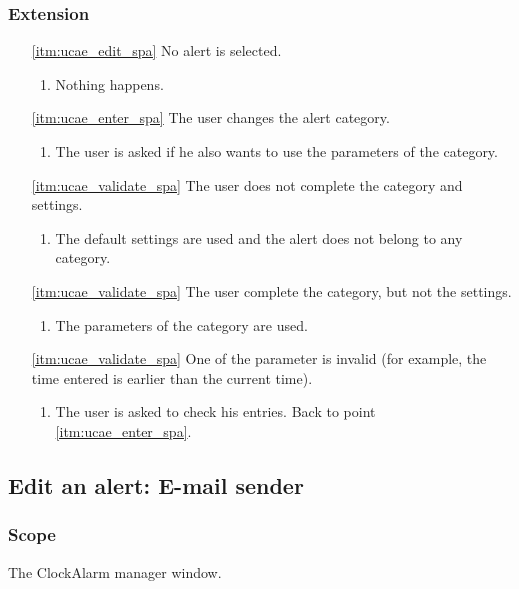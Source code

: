 \subsubsection{Extension}
\begin{enumerate}
	\item[\ref{itm:ucae_edit_spa}] No alert is selected.
	\begin{enumerate}[i]
		\item Nothing happens.
	\end{enumerate}
	
	\item[\ref{itm:ucae_enter_spa}] The user changes the alert category.
	\begin{enumerate}[i]
		\item The user is asked if he also wants to use the parameters of the category.
	\end{enumerate}
	
	\item[\ref{itm:ucae_validate_spa}] The user does not complete the category and settings.
	\begin{enumerate}[i]
		\item The default settings are used and the alert does not belong to any category.
	\end{enumerate}
	
	\item[\ref{itm:ucae_validate_spa}] The user complete the category, but not the settings.
	\begin{enumerate}[i]
		\item The parameters of the category are used.
	\end{enumerate}
	
	\item[\ref{itm:ucae_validate_spa}] One of the parameter is invalid (for example, the time entered is earlier than the current time).
	\begin{enumerate}[i]
		\item The user is asked to check his entries. Back to point \ref{itm:ucae_enter_spa}.
	\end{enumerate}
\end{enumerate}

\subsection{Edit an alert: E-mail sender}\label{subsec:usecase_edit_email_sender}

\subsubsection{Scope}
The ClockAlarm manager window.
